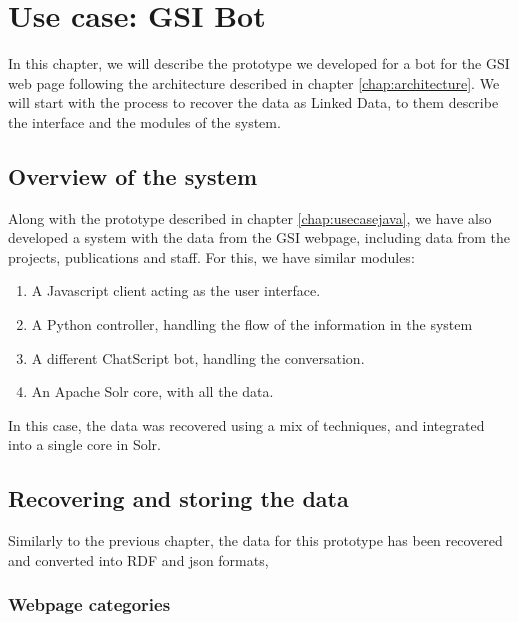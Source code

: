 \chapter{Use case: GSI Bot}
\label{chap:usecasegsi}

\begin{chapterintro}

In this chapter, we will describe the prototype we developed for a bot for the GSI web page following the architecture described in chapter \ref{chap:architecture}. We will start with the process to recover the data as Linked Data, to them describe the interface and the modules of the system.
 
\end{chapterintro}

\cleardoublepage

\section{Overview of the system}

Along with the prototype described in chapter \ref{chap:usecasejava}, we have also developed a system with the data from the GSI webpage, including data from the projects, publications and staff. For this, we have similar modules:

\begin{enumerate}
 \item A Javascript client acting as the user interface.
 \item A Python controller, handling the flow of the information in the system
 \item A different ChatScript bot, handling the conversation.
 \item An Apache Solr core, with all the data.
\end{enumerate}

In this case, the data was recovered using a mix of techniques, and integrated into a single core in Solr.

\section{Recovering and storing the data}

Similarly to the previous chapter, the data for this prototype has been recovered and converted into RDF and json formats, 

\subsection{Webpage categories}

